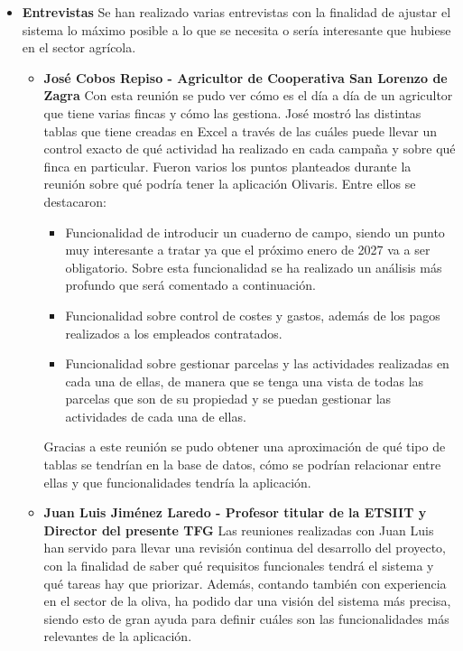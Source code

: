 \begin{itemize}
    \item \textbf{Entrevistas}
    \newline
    Se han realizado varias entrevistas con la finalidad de ajustar el sistema lo máximo posible a lo que se necesita
    o sería interesante que hubiese en el sector agrícola.

    \begin{itemize}
        \item \textbf{José Cobos Repiso - Agricultor de Cooperativa San Lorenzo de Zagra}
        \newline
        Con esta reunión se pudo ver cómo es el día a día de un agricultor que tiene varias fincas y cómo las gestiona.
        José mostró las distintas tablas que tiene creadas en Excel a través de las cuáles puede llevar un control exacto
        de qué actividad ha realizado en cada campaña y sobre qué finca en particular.
        Fueron varios los puntos planteados durante la reunión sobre qué podría tener la aplicación Olivaris. Entre
        ellos se destacaron:

        \begin{itemize}
            \item Funcionalidad de introducir un cuaderno de campo, siendo un punto muy interesante a tratar ya que el 
            próximo enero de 2027 va a ser obligatorio. Sobre esta funcionalidad se ha realizado un análisis más profundo
            que será comentado a continuación.
            \item Funcionalidad sobre control de costes y gastos, además de los pagos realizados a los empleados contratados.
            \item Funcionalidad sobre gestionar parcelas y las actividades realizadas en cada una de ellas, de manera que 
            se tenga una vista de todas las parcelas que son de su propiedad y se puedan gestionar las actividades de cada una
            de ellas. 
        \end{itemize}

        Gracias a este reunión se pudo obtener una aproximación de qué tipo de tablas se tendrían en la base de datos,
        cómo se podrían relacionar entre ellas y que funcionalidades tendría la aplicación.

        \item \textbf{Juan Luis Jiménez Laredo - Profesor titular de la ETSIIT y Director del presente TFG}
        \newline
        Las reuniones realizadas con Juan Luis han servido para llevar una revisión continua del desarrollo del proyecto,
        con la finalidad de saber qué requisitos funcionales tendrá el sistema y qué tareas hay que priorizar.
        Además, contando también con experiencia en el sector de la oliva, ha podido dar una visión del sistema más precisa,
        siendo esto de gran ayuda para definir cuáles son las funcionalidades más relevantes de la aplicación.


\end{itemize}
\end{itemize}
